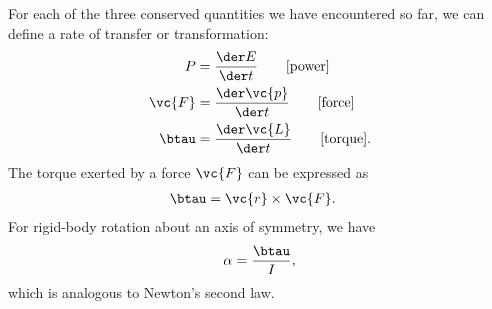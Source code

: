 For each of the three conserved quantities we have encountered so far, we can define
a rate of transfer or transformation:
\begin{align*}
  P &= \frac{\der E}{\der t} \qquad \text{[power]} \\
  \vc{F} &= \frac{\der\vc{p}}{\der t}  \qquad \text{[force]} \\
  \btau &= \frac{\der\vc{L}}{\der t}  \qquad \text{[torque]}.
\end{align*}
The torque exerted by a force $\vc{F}$ can be expressed as
\begin{align*}
  \btau &= \vc{r}\times\vc{F}.
\end{align*}
For rigid-body rotation about an axis of symmetry, we have
\begin{equation*}
  \alpha = \frac{\btau}{I},
\end{equation*}
which is analogous to Newton's second law.
